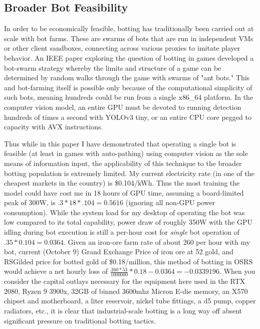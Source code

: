 \documentclass[sigconf]{acmart}
\begin{document}
\subsection{Broader Bot Feasibility}
In order to be economically feasible, botting has traditionally been carried out at scale with bot farms.\cite{botting} These are swarms of bots that are run in independent VMs or other client sandboxes, connecting across various proxies to imitate player behavior. An IEEE paper exploring the question of botting in games developed a bot-swarm strategy whereby the limits and structure of a game can be determined by random walks through the game with swarms of "ant bots." \cite{Ant} This and bot-farming itself is possible only because of the computational simplicity of such bots, meaning hundreds could be run from a single x86\_64 platform. In the computer vision model, an entire GPU must be devoted to running detection hundreds of times a second with YOLOv3 tiny, or an entire CPU core pegged to capacity with AVX instructions. \cite{YOLO}

Thus while in this paper I have demonstrated that operating a single bot is feasible (at least in games with auto-pathing) using computer vision as the sole means of information input, the applicability of this technique to the broader botting population is extremely limited. My current electricity rate (in one of the cheapest markets in the country) is \$0.104/kWh. Thus the most training the model could have cost me in 18 hours of GPU time, assuming a board-limited peak of 300W, is $.3*18*.104=0.5616$ (ignoring all non-GPU power consumption). While the system load for my desktop of operating the bot was low compared to its total capability, power draw of roughly 350W with the GPU idling during bot execution is still a per-hour cost for \textit{single} bot operation of $.35*0.104=0.0364$. Given an iron-ore farm rate of about 260 per hour with my bot, current (October 9) Grand Exchange Price of iron ore at 52 gold, and RSGilded price for botted gold of \$0.18/million, this method of botting in OSRS would achieve a net hourly loss of $\frac{260*53}{1000000}*0.18-0.0364=-0.0339196$. When you consider the capital outlays necessary for the equipment here used in the RTX 2080, Ryzen 9 3900x, 32GB of binned 3600mhz Micron E-die memory, an X570 chipset and motherboard, a liter reservoir, nickel tube fittings, a d5 pump, copper radiators, etc., it is clear that industrial-scale botting is a long way off absent significant pressure on traditional botting tactics.
\end{document}

